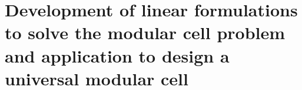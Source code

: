 \chapter{Development of linear formulations to solve the modular cell problem and application to design a universal modular cell} \label{ch:milp}
